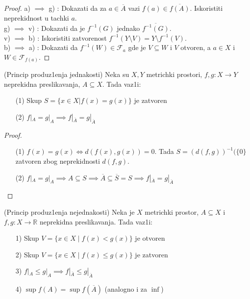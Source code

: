 \documentclass[a4paper,12pt]{article}
\newcommand{\RR}{\mathbb{R}}
\newcommand{\psj}{\subseteq}
\begin{document}
\begin{proof}
a) $\implies$ g) : Dokazati da za $a\in \overline{A}$ vazi $f(a) \in \overline{f(A)}$. Iskoristiti neprekidnost u tachki $a$. \\ 
g) $\implies$ v) : Dokazati da je $f^{-1}(G)$ jednako $\overline{f^{-1}(G)}$. \\
v) $\implies$ b) : Iskoristiti zatvorenost $f^{-1}(Y \setminus V) = Y \setminus f^{-1}(V)$. \\
b) $\implies$ a) : Dokazati da $f^{-1}(W) \in \mathcal{F}_a$ gde je $V \psj W$ i $V$ otvoren, a $a \in X$ i $W \in \mathcal{F}_{f(a)}$. 
\end{proof}

\begin{tvr}
(Princip produz1enja jednakosti) Neka su $X, Y$ metrichki prostori, $f,g : X \to Y$ neprekidna preslikavanja, $A \psj X$. Tada vaz1i:
\begin{itemize}
\item[(1)] Skup $S = \{x \in X | f(x) = g(x) \}$ je zatvoren
\item[(2)] $f|_A = g|_A \implies f|_{\overline{A}} = g|_{\overline{A}}$
\end{itemize}
\end{tvr}
\begin{proof}
\begin{itemize}
\item[(1)] $f(x) = g(x) \Leftrightarrow d(f(x), g(x)) = 0$. Tada $S = {(d(f,g))}^{-1}(\{ 0 \}$ zatvoren zbog neprekidnosti $ d(f,g)$.
\item[(2)] $f|_A = g|_A \implies A \psj S \implies \overline{A} \psj \overline{S} = S \implies f|_{\overline{A}} = g|_{\overline{A}}$
\end{itemize}
\end{proof}

\begin{tvr}
(Princip produz1enja nejednakosti) Neka je $X$ metrichki prostor, $A \psj X$ i $f,g : X \to \RR$ neprekidna preslikavanja. Tada vaz1i:
\begin{itemize}
\item[1)] Skup $V = \{x \in X \mid f(x) < g(x) \}$ je otvoren
\item[2)] Skup $V = \{x \in X \mid f(x) \leq g(x) \}$ je zatvoren
\item[3)] $f|_A \leq g|_A \implies f|_{\overline{A}} \leq g|_{\overline{A}}$
\item[4)] $\sup f(A) = \sup f(\overline{A})$ (analogno i za $\inf$)
\end{itemize}
\end{tvr}
\end{document}
